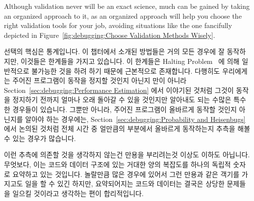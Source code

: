 Although validation never will be an exact science, much can be gained
by taking an organized approach to it, as an organized approach will
help you choose the right validation tools for your job, avoiding
situations like the one fancifully depicted in
Figure~\ref{fig:debugging:Choose Validation Methods Wisely}.
\fi

선택의 핵심은 통계입니다.
이 챕터에서 소개된 방법들은 거의 모든 경우에 잘 동작하지만, 이것들은 한계들을
가지고 있습니다.
이 한계들은
Halting Problem~\cite{AlanMTuring1937HaltingProblem,GeoffreyKPullum2000HaltingProblem}
에 의해 일반적으로 불가능한 것을 하려 하기 때문에 근본적으로 존재합니다.
다행히도 우리에게는 주어진 프로그램이 동작을 정지할 것인지 아닌지 만이 아니라
Section~\ref{sec:debugging:Performance Estimation} 에서 이야기된 것처럼
그것이 동작을 정지하기 전까지 얼마나 오래 돌아갈 수 있을 것인지만 알아내도 되는
수많은 특수한 경우들이 있습니다.
그뿐만 아니라, 주어진 프로그램이 올바르게 동작할 것인지 아닌지를 알아야 하는
경우에는,
Section~\ref{sec:debugging:Probability and Heisenbugs} 에서 논의된 것처럼 전체
시간 중 얼만큼의 부분에서 올바르게 동작하는지 추측을 해볼 수 있는 경우가
많습니다.

이런 추측에 의존할 것을 생각하지 않는건 만용을 부리려는것 이상도 이하도
아닙니다.
무엇보다, 이는 코드와 데이터 구조에 있는 거대한 양의 복잡도를 하나의 독립적
숫자로 요약하고 있는 것입니다.
놀랄만큼 많은 경우에 있어서 그런 만용과 같은 객기를 가지고도 일을 할 수 있긴
하지만, 요약되어지는 코드와 데이터는 결국은 상당한 문제들을 일으킬 것이라고
생각하는 편이 합리적입니다.

